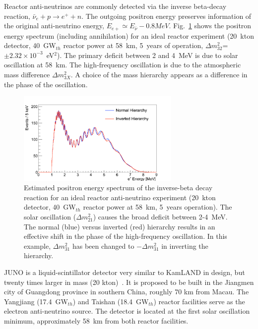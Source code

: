 Reactor anti-neutrinos are commonly detected via the inverse beta-decay reaction,
$\bar{\nu}_{e} + p \rightarrow e^{+} + n$.  The outgoing positron
energy preserves information of the original anti-neutrino energy,
$E_{e+} \simeq E_{\bar{\nu}} - 0.8 MeV$.
Fig.~\ref{fig:reactorTrue_NoDegeneracy} shows the positron energy
spectrum (including annihilation) for an ideal reactor experiment
(20~kton detector, 40~GW$_{th}$ reactor power at 58~km, 5~years of
operation, ${\Delta}m^2_{32}$=$\pm2.32\times10^{-3}$~eV$^{2}$).  The
primary deficit between 2 and 4~MeV is due to solar oscillation at
58~km.  The high-frequency oscillation is due to the atmospheric
mass difference ${\Delta}m^{2}_{3X}$.  A choice of the mass hierarchy
appears as a difference
in the phase of the oscillation.

\begin{figure}[b]
\centering
\includegraphics[width=0.7\textwidth]{DAD/worst_case_JUNO.pdf}
\caption{Estimated positron energy spectrum of the inverse-beta decay reaction for
  an ideal reactor anti-neutrino experiment (20~kton detector,
  40~GW$_{th}$ reactor power at 58~km, 5~years operation).  The solar
  oscillation (${\Delta}m^{2}_{21}$) causes the broad deficit between
  2-4~MeV.  The normal (blue) versus inverted (red) hierarchy 
results in an
  effective shift in the phase of the high-frequency oscillation.  In this example, $\Delta m^2_{31}$ has been changed to  $-\Delta m^2_{31}$ in inverting the hierarchy.}
\label{fig:reactorTrue_NoDegeneracy}
\end{figure}

JUNO is a liquid-scintillator detector very similar to KamLAND in
design, but twenty times larger in mass (20 kton)~\cite{yfwang_INPA_2013}.  It
is proposed to be built in the Jiangmen city of Guangdong province in
southern China, roughly 70 km from Macau.  The Yangjiang
(17.4~GW$_{th}$) and Taishan (18.4~GW$_{th}$) reactor facilities serve
as the electron anti-neutrino source.  The detector is located at the first
solar oscillation minimum, approximately 58~km from both reactor
facilities.

